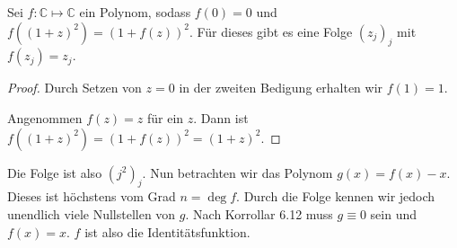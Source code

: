 \documentclass[10pt,a4paper]{article}
\begin{document}
Sei $f: \mathbb{C} \mapsto \mathbb{C}$ ein Polynom, sodass $f(0) = 0$ und
$f((1 + z)^{2}) = (1 + f(z))^{2}$. Für dieses gibt es eine Folge $(z_{j})_{j}$
mit $f(z_{j}) = z_{j}$.

\begin{proof}
  Durch Setzen von $z = 0$ in der zweiten Bedigung erhalten wir $f(1) = 1$.

  Angenommen $f(z) = z$ für ein $z$. Dann ist
  $f((1 + z)^{2}) = (1 + f(z))^{2} = (1 + z)^{2}$.
\end{proof}

\noindent
Die Folge ist also $(j^{2})_{j}$. Nun betrachten wir das Polynom
$g(x) = f(x) - x$. Dieses ist höchstens vom Grad $n = \deg f$. Durch die Folge
kennen wir jedoch unendlich viele Nullstellen von $g$. Nach Korrollar 6.12 muss
$g \equiv 0$ sein und $f(x) = x$. $f$ ist also die Identitätsfunktion.
\end{document}
